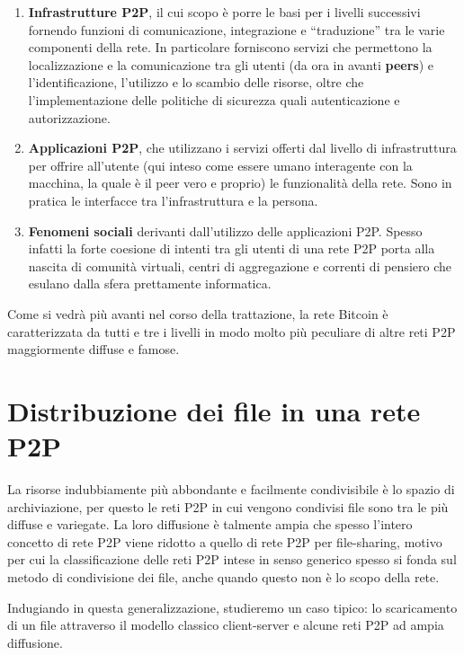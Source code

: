 \begin{enumerate}
\def\labelenumi{\arabic{enumi}.}
\item
  \textbf{Infrastrutture P2P}, il cui scopo è porre le basi per i   livelli successivi fornendo funzioni di comunicazione, integrazione e   ``traduzione'' tra le varie componenti della rete. In particolare   forniscono servizi che permettono la localizzazione e la comunicazione   tra gli utenti (da ora in avanti \textbf{peers}) e l'identificazione,   l'utilizzo e lo scambio delle risorse, oltre che l'implementazione   delle politiche di sicurezza quali autenticazione e autorizzazione.
\item
  \textbf{Applicazioni P2P}, che utilizzano i servizi offerti dal   livello di infrastruttura per offrire all'utente (qui inteso come   essere umano interagente con la macchina, la quale è il peer vero e   proprio) le funzionalità della rete. Sono in pratica le interfacce tra   l'infrastruttura e la persona.
\item
  \textbf{Fenomeni sociali} derivanti dall'utilizzo delle applicazioni   P2P. Spesso infatti la forte coesione di intenti tra gli utenti di una   rete P2P porta alla nascita di comunità virtuali, centri di   aggregazione e correnti di pensiero che esulano dalla sfera   prettamente informatica.
\end{enumerate}

Come si vedrà più avanti nel corso della trattazione, la rete Bitcoin è caratterizzata da tutti e tre i livelli in modo molto più peculiare di altre reti P2P maggiormente diffuse e famose.

\section{Distribuzione dei file in una rete P2P}\label{distribuzione-dei-file-in-una-rete-p2p}

La risorse indubbiamente più abbondante e facilmente condivisibile è lo spazio di archiviazione, per questo le reti P2P in cui vengono condivisi file sono tra le più diffuse e variegate. La loro diffusione è talmente ampia che spesso l'intero concetto di rete P2P viene ridotto a quello di rete P2P per file-sharing, motivo per cui la classificazione delle reti P2P intese in senso generico spesso si fonda sul metodo di condivisione dei file, anche quando questo non è lo scopo della rete.

Indugiando in questa generalizzazione, studieremo un caso tipico: lo scaricamento di un file attraverso il modello classico client-server e alcune reti P2P ad ampia diffusione.


